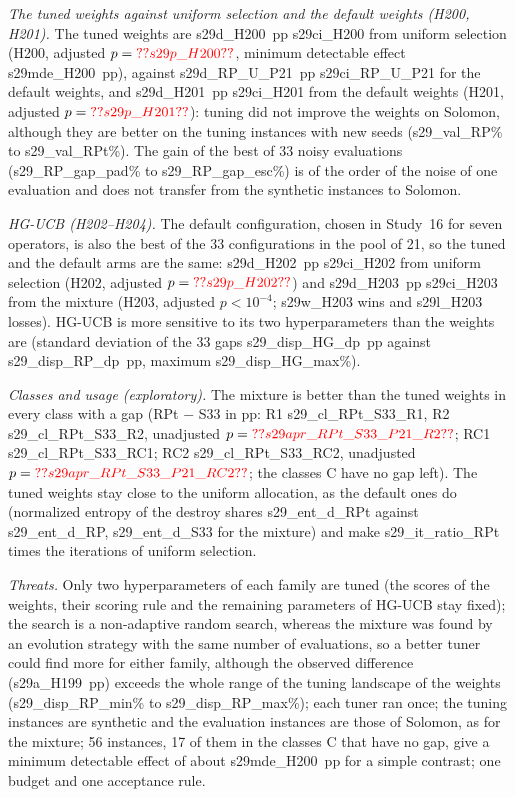 \emph{The tuned weights against uniform selection and the default weights (H200, H201).} The tuned weights are \num{s29d_H200}~pp \num{s29ci_H200} from uniform selection (H200, adjusted $p=\num{s29p_H200}$, minimum detectable effect \num{s29mde_H200}~pp), against \num{s29d_RP_U_P21}~pp \num{s29ci_RP_U_P21} for the default weights, and \num{s29d_H201}~pp \num{s29ci_H201} from the default weights (H201, adjusted $p=\num{s29p_H201}$): tuning did not improve the weights on Solomon, although they are better on the tuning instances with new seeds (\num{s29_val_RP}\% to \num{s29_val_RPt}\%). The gain of the best of 33 noisy evaluations (\num{s29_RP_gap_pad}\% to \num{s29_RP_gap_esc}\%) is of the order of the noise of one evaluation and does not transfer from the synthetic instances to Solomon.

\emph{HG-UCB (H202--H204).} The default configuration, chosen in Study~16 for seven operators, is also the best of the 33 configurations in the pool of 21, so the tuned and the default arms are the same: \num{s29d_H202}~pp \num{s29ci_H202} from uniform selection (H202, adjusted $p=\num{s29p_H202}$) and \num{s29d_H203}~pp \num{s29ci_H203} from the mixture (H203, adjusted $p<10^{-4}$; \num{s29w_H203} wins and \num{s29l_H203} losses). HG-UCB is more sensitive to its two hyperparameters than the weights are (standard deviation of the 33 gaps \num{s29_disp_HG_dp}~pp against \num{s29_disp_RP_dp}~pp, maximum \num{s29_disp_HG_max}\%).

\emph{Classes and usage (exploratory).} The mixture is better than the tuned weights in every class with a gap (RPt $-$ S33 in pp: R1 \num{s29_cl_RPt_S33_R1}, R2 \num{s29_cl_RPt_S33_R2}, unadjusted $p=\num{s29apr_RPt_S33_P21_R2}$; RC1 \num{s29_cl_RPt_S33_RC1}; RC2 \num{s29_cl_RPt_S33_RC2}, unadjusted $p=\num{s29apr_RPt_S33_P21_RC2}$; the classes C have no gap left). The tuned weights stay close to the uniform allocation, as the default ones do (normalized entropy of the destroy shares \num{s29_ent_d_RPt} against \num{s29_ent_d_RP}, \num{s29_ent_d_S33} for the mixture) and make \num{s29_it_ratio_RPt} times the iterations of uniform selection.

\emph{Threats.} Only two hyperparameters of each family are tuned (the scores of the weights, their scoring rule and the remaining parameters of HG-UCB stay fixed); the search is a non-adaptive random search, whereas the mixture was found by an evolution strategy with the same number of evaluations, so a better tuner could find more for either family, although the observed difference (\num{s29a_H199}~pp) exceeds the whole range of the tuning landscape of the weights (\num{s29_disp_RP_min}\% to \num{s29_disp_RP_max}\%); each tuner ran once; the tuning instances are synthetic and the evaluation instances are those of Solomon, as for the mixture; 56 instances, 17 of them in the classes C that have no gap, give a minimum detectable effect of about \num{s29mde_H200}~pp for a simple contrast; one budget and one acceptance rule.



